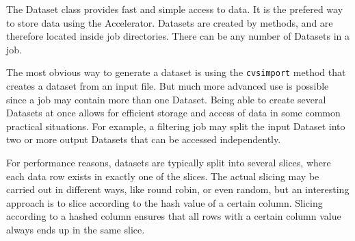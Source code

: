 
The Dataset class provides fast and simple access to data.  It is the
prefered way to store data using the Accelerator.  Datasets are
created by methods, and are therefore located inside job directories.
There can be any number of Datasets in a job.

The most obvious way to generate a dataset is using the
\texttt{cvsimport} method that creates a dataset from an input file.
But much more advanced use is possible since a job may contain more
than one Dataset.  Being able to create several Datasets at once
allows for efficient storage and access of data in some common
practical situations.  For example, a filtering job may split the
input Dataset into two or more output Datasets that can be accessed
independently.

For performance reasons, datasets are typically split into several
slices, where each data row exists in exactly one of the slices.  The
actual slicing may be carried out in different ways, like round robin,
or even random, but an interesting approach is to slice according to
the hash value of a certain column.  Slicing according to a hashed
column ensures that all rows with a certain column value always ends
up in the same slice.

